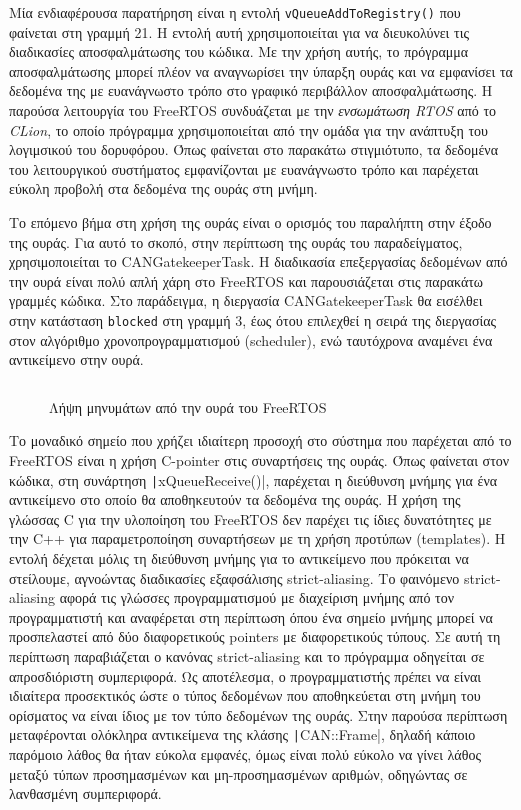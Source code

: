 \documentclass[a4paper,nobib,justified]{tufte-book}
\begin{document}
\label{sec:queue-registry}
Μία ενδιαφέρουσα παρατήρηση είναι η εντολή \texttt{vQueueAddToRegistry()} που φαίνεται στη γραμμή 21. Η εντολή αυτή χρησιμοποιείται για να διευκολύνει τις διαδικασίες αποσφαλμάτωσης του κώδικα. Με την χρήση αυτής, το πρόγραμμα αποσφαλμάτωσης μπορεί πλέον να αναγνωρίσει την ύπαρξη ουράς και να εμφανίσει τα δεδομένα της με ευανάγνωστο τρόπο στο γραφικό περιβάλλον αποσφαλμάτωσης. Η παρούσα λειτουργία του FreeRTOS συνδυάζεται με την \emph{ενσωμάτωση RTOS} από το \emph{CLion}, το οποίο πρόγραμμα χρησιμοποιείται από την ομάδα για την ανάπτυξη του λογιμσικού του δορυφόρου. Όπως φαίνεται στο παρακάτω στιγμιότυπο, τα δεδομένα του λειτουργικού συστήματος εμφανίζονται με ευανάγνωστο τρόπο και παρέχεται εύκολη προβολή στα δεδομένα της ουράς στη μνήμη. 

Το επόμενο βήμα στη χρήση της ουράς είναι ο ορισμός του παραλήπτη στην έξοδο της ουράς. Για αυτό το σκοπό, στην περίπτωση της ουράς του παραδείγματος, χρησιμοποιείται το CANGatekeeperTask. Η διαδικασία επεξεργασίας δεδομένων από την ουρά είναι πολύ απλή χάρη στο FreeRTOS και παρουσιάζεται στις παρακάτω γραμμές κώδικα. Στο παράδειγμα, η διεργασία CANGatekeeperTask θα εισέλθει στην κατάσταση \texttt{blocked} στη γραμμή 3, έως ότου επιλεχθεί η σειρά της διεργασίας στον αλγόριθμο χρονοπρογραμματισμού (scheduler), ενώ ταυτόχρονα αναμένει ένα αντικείμενο στην ουρά.
\begin{figure}
	\inputminted{c++}{code/examples/gatekeeper-execute-short.cpp}
	\label{code:gatekeeper-execute-short}
	\caption[Λήψη μηνυμάτων από την ουρά του FreeRTOS]{Λήψη μηνυμάτων από την ουρά του FreeRTOS}
\end{figure}

Το μοναδικό σημείο που χρήζει ιδιαίτερη προσοχή στο σύστημα που παρέχεται από το FreeRTOS είναι η χρήση C-pointer στις συναρτήσεις της ουράς. Όπως φαίνεται στον κώδικα, στη συνάρτηση \texttt|xQueueReceive()|, παρέχεται η διεύθυνση μνήμης για ένα αντικείμενο στο οποίο θα αποθηκευτούν τα δεδομένα της ουράς. Η χρήση της γλώσσας C για την υλοποίηση του FreeRTOS δεν παρέχει τις ίδιες δυνατότητες με την C++ για παραμετροποίηση συναρτήσεων με τη χρήση προτύπων (templates). Η εντολή δέχεται μόλις τη διεύθυνση μνήμης για το αντικείμενο που πρόκειται να στείλουμε, αγνοώντας διαδικασίες εξαφσάλισης strict-aliasing. Το φαινόμενο strict-aliasing αφορά τις γλώσσες προγραμματισμού με διαχείριση μνήμης από τον προγραμματιστή και αναφέρεται στη περίπτωση όπου ένα σημείο μνήμης μπορεί να προσπελαστεί από δύο διαφορετικούς pointers με διαφορετικούς τύπους. Σε αυτή τη περίπτωση παραβιάζεται ο κανόνας strict-aliasing και το πρόγραμμα οδηγείται σε απροσδιόριστη συμπεριφορά. Ως αποτέλεσμα, ο προγραμματιστής πρέπει να είναι ιδιαίτερα προσεκτικός ώστε ο τύπος δεδομένων που αποθηκεύεται στη μνήμη του ορίσματος να είναι ίδιος με τον τύπο δεδομένων της ουράς. Στην παρούσα περίπτωση μεταφέρονται ολόκληρα αντικείμενα της κλάσης \texttt|CAN::Frame|, δηλαδή κάποιο παρόμοιο λάθος θα ήταν εύκολα εμφανές, όμως είναι πολύ εύκολο να γίνει λάθος μεταξύ τύπων προσημασμένων και μη-προσημασμένων αριθμών, οδηγώντας σε λανθασμένη συμπεριφορά.
\end{document}
